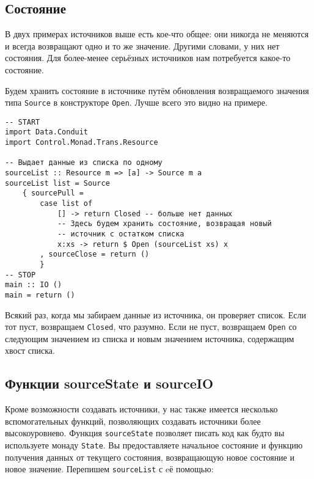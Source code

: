 {\subsection{Состояние}
В двух примерах источников выше есть кое-что общее: они никогда не меняются и всегда возвращают одно и то же
значение. Другими словами, у них нет состояния. Для более-менее серьёзных источников нам
потребуется какое-то состояние.


Будем хранить состояние в источнике путём обновления возвращаемого значения типа
\lstinline=Source= в конструкторе \lstinline=Open=. Лучше всего это видно на
примере.

\begin{lstlisting}
-- START
import Data.Conduit
import Control.Monad.Trans.Resource

-- Выдает данные из списка по одному
sourceList :: Resource m => [a] -> Source m a
sourceList list = Source
    { sourcePull =
        case list of
            [] -> return Closed -- больше нет данных
            -- Здесь будем хранить состояние, возвращая новый 
            -- источник с остатком списка
            x:xs -> return $ Open (sourceList xs) x
        , sourceClose = return ()
        }
-- STOP
main :: IO ()
main = return ()
\end{lstlisting}

Всякий раз, когда мы забираем данные из источника, он проверяет список. Если тот пуст,
возвращаем \lstinline=Closed=, что разумно. Если не пуст, возвращаем \lstinline=Open= со
следующим значением из
списка и новым значением источника, содержащим хвост списка.

\subsection{Функции sourceState и sourceIO}
Кроме возможности создавать источники, у нас также имеется несколько вспомогательных функций,
позволяющих создавать источники более высокоуровнево. Функция \lstinline=sourceState=
позволяет писать
код как будто вы используете монаду \lstinline=State=. Вы предоставляете начальное
состояние и
функцию получения данных от текущего состояния, возвращающую новое состояние и
новое значение. Перепишем \lstinline=sourceList= с eё помощью:

}
